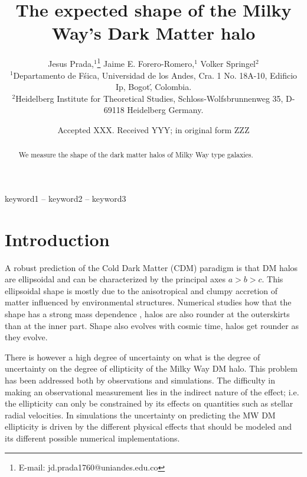 \documentclass[a4paper,fleqn,usenatbib]{mnras}
\title[Title]{The expected shape of the Milky Way's Dark Matter halo}
\author[Jesus Prada,  Jaime E. Forero-Romero, Volker Springel ]{
Jesus Prada,$^{1}$\thanks{E-mail: jd.prada1760@uniandes.edu.co}
Jaime E. Forero-Romero,$^{1}$
Volker Springel$^{2}$
\\
$^{1}$Departamento de F\'sica, Universidad de los Andes, Cra. 1 No.
18A-10, Edificio Ip, Bogot\', Colombia.\\
$^{2}$Heidelberg Institute for Theoretical Studies, Schloss-Wolfsbrunnenweg 35, D-69118 Heidelberg
Germany.\\
}
\date{Accepted XXX. Received YYY; in original form ZZZ}
\begin{document}
\label{firstpage}
\pagerange{\pageref{firstpage}--\pageref{lastpage}}
\maketitle

\begin{abstract}
We measure the shape of the dark matter halos of Milky Way type galaxies.
\end{abstract}

\begin{keywords}
keyword1 -- keyword2 -- keyword3
\end{keywords}



\section{Introduction}


A robust prediction of the Cold Dark Matter (CDM) paradigm is that DM
halos are ellipsoidal and can be characterized by the principal axes
$a>b>c$.
This ellipsoidal shape is mostly due to the anisotropical and
clumpy accretion of matter influenced by environmental structures.
Numerical studies how that the shape has a strong mass dependence
\citep{Allgood_et_al._2006}, halos are also rounder at the outerskirts
than at the inner part. 
Shape also evolves with cosmic time, halos get
rounder as they evolve.  

There is however a high degree of uncertainty on what is the degree of
uncertainty on the degree of ellipticity of the Milky Way DM halo.
This problem has been addressed both by observations and simulations.
The difficulty in making an observational measurement lies in the
indirect nature of the effect; i.e. the ellipticity can only be
constrained by its effects on quantities such as stellar radial
velocities.
In simulations the uncertainty on predicting the MW DM ellipticity is 
driven by the different physical effects that should be modeled and
its different possible numerical implementations.
\end{document}
